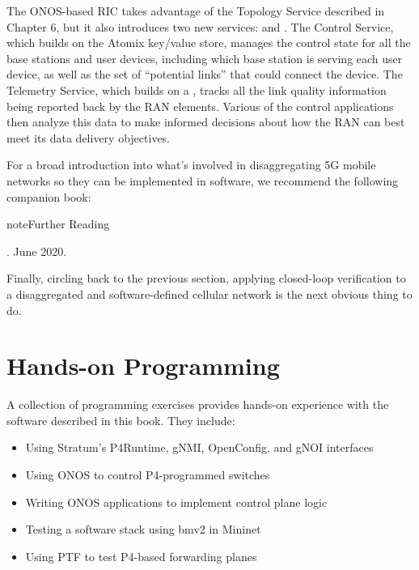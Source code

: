\documentclass[letterpaper,11pt,english]{sphinxmanual}
\begin{document}
The ONOS-based RIC takes advantage of the Topology Service described
in Chapter 6, but it also introduces two new services:  and
. The Control Service, which builds on the Atomix key/value
store, manages the control state for all the base stations and user
devices, including which base station is serving each user device, as
well as the set of  “potential links” that could connect the device.
The Telemetry Service, which builds on a , tracks all the link quality information being reported back
by the RAN elements. Various of the control applications then analyze
this data to make informed decisions about how the RAN can best meet
its data delivery objectives.

For a broad introduction into what’s involved in disaggregating 5G
mobile networks so they can be implemented in software, we recommend
the following companion book:

\label{\detokenize{future:id3}}
\begin{sphinxadmonition}{note}{Further Reading}

. June 2020.
\end{sphinxadmonition}

Finally, circling back to the previous section, applying closed-loop
verification to a disaggregated and software-defined cellular network
is the next obvious thing to do.


\chapter{Hands-on Programming}
\label{\detokenize{exercises:hands-on-programming}}\label{\detokenize{exercises::doc}}
A collection of programming exercises provides hands-on experience with
the software described in this book. They include:
\begin{itemize}
\item {} 
Using Stratum’s P4Runtime, gNMI, OpenConfig, and gNOI interfaces

\item {} 
Using ONOS to control P4-programmed switches

\item {} 
Writing ONOS applications to implement control plane logic

\item {} 
Testing a software stack using bmv2 in Mininet

\item {} 
Using PTF to test P4-based forwarding planes

\end{itemize}
\end{document}
